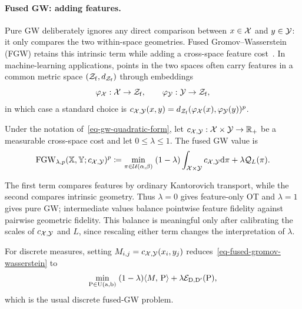 \paragraph{Fused GW: adding features.}
Pure GW deliberately ignores any direct comparison between $x\in\mathcal{X}$ and $y\in\mathcal{Y}$: it only compares the two within-space geometries. Fused Gromov--Wasserstein (FGW) retains this intrinsic term while adding a cross-space feature cost~\cite{vayer2019optimaltransportstructured}. In machine-learning applications, points in the two spaces often carry features in a common metric space $(\mathcal Z_{\mathrm f},d_{\mathcal Z_{\mathrm f}})$ through embeddings
\[
	\varphi_{\mathcal{X}}:\mathcal{X}\to\mathcal Z_{\mathrm f},
	\qquad
	\varphi_{\mathcal{Y}}:\mathcal{Y}\to\mathcal Z_{\mathrm f},
\]
in which case a standard choice is
$c_{\mathcal{X},\mathcal{Y}}(x,y)=d_{\mathcal Z_{\mathrm f}}(\varphi_{\mathcal{X}}(x),\varphi_{\mathcal{Y}}(y))^p$.

\begin{defn}\label{def-fused-gromov-wasserstein}
	Under the notation of~\eqref{eq-gw-quadratic-form}, let
	$c_{\mathcal{X},\mathcal{Y}}:\mathcal{X}\times\mathcal{Y}\to\mathbb{R}_+$ be a measurable cross-space cost and let $0\leq\lambda\leq1$. The fused GW value is
	\begin{equation}\label{eq-fused-gromov-wasserstein}
		\operatorname{FGW}_{\lambda,p}(\mathbb{X},\mathbb{Y};c_{\mathcal{X},\mathcal{Y}})^p
		\coloneqq
		\underset{\pi\in\mathcal{U}(\alpha,\beta)}{\min}\;
		(1-\lambda)\int_{\mathcal{X}\times\mathcal{Y}}c_{\mathcal{X},\mathcal{Y}}\mathrm{d}\pi
		+
		\lambda\mathcal Q_L(\pi).
	\end{equation}
\end{defn}
The first term compares features by ordinary Kantorovich transport, while the second compares intrinsic geometry. Thus $\lambda=0$ gives feature-only OT and $\lambda=1$ gives pure GW; intermediate values balance pointwise feature fidelity against pairwise geometric fidelity. This balance is meaningful only after calibrating the scales of $c_{\mathcal{X},\mathcal{Y}}$ and $L$, since rescaling either term changes the interpretation of $\lambda$.

For discrete measures, setting
$M_{i,j}=c_{\mathcal{X},\mathcal{Y}}(x_i,y_j)$
reduces~\eqref{eq-fused-gromov-wasserstein} to
\[
	\underset{\mathrm{P}\in\mathrm{U}(\mathrm{a},\mathrm{b})}{\min}\;
	(1-\lambda)\langle M,\,\mathrm{P}\rangle
	+
	\lambda\mathcal{E}_{\mathrm{D},\mathrm{D}'}(\mathrm{P}),
\]
which is the usual discrete fused-GW problem.

